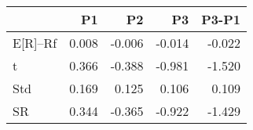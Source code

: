 \begin{tabular}{lrrrr}
\toprule
 & P1 & P2 & P3 & P3-P1 \\
\midrule
E[R]--Rf & 0.008 & -0.006 & -0.014 & -0.022 \\
t & 0.366 & -0.388 & -0.981 & -1.520 \\
Std & 0.169 & 0.125 & 0.106 & 0.109 \\
SR & 0.344 & -0.365 & -0.922 & -1.429 \\
\bottomrule
\end{tabular}
